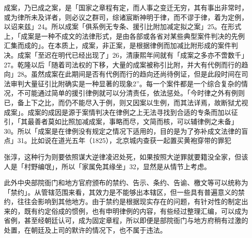 成案，乃已成之案，是「国家之章程有定，而人事之变迁无穷，其有事出非常时，或为律所未及详者，则必议之群司，综诸宸断神明于律，而不谬于律，着为定例，以诏来兹」24。所以成案「俱系例无专条、援引比附加减定拟之案」25。在形式上，「成案是一种不成文的法律形式，是由各部或各省对某些典型案件判决的先例汇集而成的」。在本质上，成案，非正案，是根据律例而加减比附形成的案件判决。成案「至迟在明代已经出现了」26，清康熙年间就有「成案之多亦不啻数千」27。乾隆以后「随着司法权的下移，大量的成案被称引比附，并大有代例而行的趋向」28。虽然成案在此期间是否有代例而行的趋向还尚待例证，但是此段时间在司法审判大量征引比附确实是一种显著的现象2”。每一个案件都是一个综合复杂的情况，不可能通过简单的援引律例就可以分清责任，依法惩处。「今时律之外有例则已，备上下之比，而仍不能尽入于例，则又因案以生例，而其法详焉，故断狱尤视成案」。成案的成因是源于案情判决在律例之上无法寻找到合适的专条而加以征引，「其最善者莫如比照加减成案，事略而尽，文简而核，可以辅律例之未备」30。所以「成案是在律例没有规定之情况下适用的，目的是为了弥补成文法律的盲点」31。比如说在道光五年（1825），北京城内查获一起置买黄袍穿带的罪犯

\vfill
\begin{BookNotes}
\end{BookNotes}

\noindent 张淳，这种行为则要依照谋大逆律凌迟处死，如果按照大逆罪就要籍没全家，但该人是「村野编氓」，所以「家属免其缘坐」32，显然是从情节上考虑。

此外中央部院衙门和地方官府颁布的禁约、告示、条约、告谕、檄文等可以统称为「禁约」。从管辖范围来看，其效力是不能够出本辖区，但一些具有普遍意义的禁约，往往会影响到其他地方。由于禁约是根据现实存在的问题，有针对性的制定出来的，既有约定俗成的惯例，也有申明律例的内容，有些经过整理汇编，可以成为省例，甚至经朝廷认可，成为固定章程，所以即便是部院衙门与地方府稍有过激的处置，在朝廷及上司的默许的情况下，也不属于违法。

